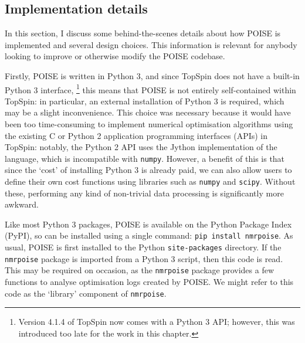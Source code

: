 \subsection{Implementation details}
\label{subsec:poise__implementation}

In this section, I discuss some behind-the-scenes details about how POISE is implemented and several design choices.
This information is relevant for anybody looking to improve or otherwise modify the POISE codebase.

Firstly, POISE is written in Python 3, and since TopSpin does not have a built-in Python 3 interface,%
\footnote{Version 4.1.4 of TopSpin now comes with a Python 3 API; however, this was introduced too late for the work in this chapter.}
this means that POISE is not entirely self-contained within TopSpin: in particular, an external installation of Python 3 is required, which may be a slight inconvenience.
This choice was necessary because it would have been too time-consuming to implement numerical optimisation algorithms using the existing C or Python 2 application programming interfaces (APIs) in TopSpin: notably, the Python 2 API uses the Jython implementation of the language, which is incompatible with \texttt{numpy}.
However, a benefit of this is that since the `cost' of installing Python 3 is already paid, we can also allow users to define their own cost functions using libraries such as \texttt{numpy} and \texttt{scipy}.
Without these, performing any kind of non-trivial data processing is significantly more awkward.

Like most Python 3 packages, POISE is available on the Python Package Index (PyPI), so can be installed using a single command: \texttt{pip install nmrpoise}.
As usual, POISE is first installed to the Python \texttt{site-packages} directory.
If the \texttt{nmrpoise} package is imported from a Python 3 script, then this code is read.
This may be required on occasion, as the \texttt{nmrpoise} package provides a few functions to analyse optimisation logs created by POISE.
We might refer to this code as the `library' component of \texttt{nmrpoise}.

